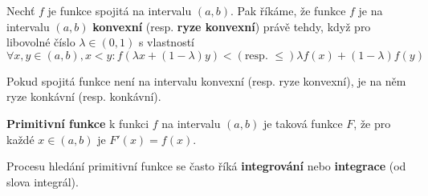 \begin{definition}
  Nechť $f$ je funkce spojitá na intervalu $(a,b)$. Pak říkáme, že funkce $f$ je na intervalu $(a,b)$ \textbf{konvexní} (resp. \textbf{ryze konvexní}) právě tehdy, když pro libovolné číslo $\lambda \in (0,1)$ s vlastností $\forall x,y\in (a,b),x<y:f(\lambda x+(1-\lambda )y) < (\text{resp. } \leq) \lambda f(x)+(1-\lambda )f(y)$

  Pokud spojitá funkce není na intervalu konvexní (resp. ryze konvexní), je na něm ryze konkávní (resp. konkávní).
\end{definition}

\begin{definition}
  \textbf{Primitivní funkce} k funkci $f$ na intervalu $(a,b)$ je taková funkce $F$, že pro každé $x\in (a,b)$ je $F'(x)=f(x)$.

  Procesu hledání primitivní funkce se často říká \textbf{integrování} nebo \textbf{integrace} (od slova integrál).
\end{definition}
